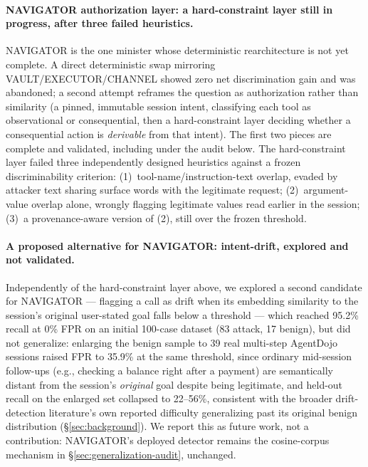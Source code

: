 \paragraph{NAVIGATOR authorization layer: a hard-constraint layer still in
progress, after three failed heuristics.}
\label{par:navigator-authflow}
NAVIGATOR is the one minister whose deterministic rearchitecture is not
yet complete. A direct deterministic swap mirroring VAULT/EXECUTOR/CHANNEL
showed zero net discrimination gain and was abandoned; a second attempt
reframes the question as authorization rather than similarity (a pinned,
immutable session intent, classifying each tool as observational or
consequential, then a hard-constraint layer deciding whether a
consequential action is \emph{derivable} from that intent). The first two
pieces are complete and validated, including under the audit below. The
hard-constraint layer failed three independently designed heuristics
against a frozen discriminability criterion: (1)~tool-name/instruction-text
overlap, evaded by attacker text sharing surface words with the
legitimate request; (2)~argument-value overlap alone, wrongly flagging
legitimate values read earlier in the session; (3)~a provenance-aware
version of (2), still over the frozen threshold.

\paragraph{A proposed alternative for NAVIGATOR: intent-drift, explored and
not validated.} Independently of the hard-constraint layer above, we
explored a second candidate for NAVIGATOR --- flagging a call as drift
when its embedding similarity to the session's original user-stated goal
falls below a threshold --- which reached 95.2\% recall at 0\% FPR on an
initial 100-case dataset (83 attack, 17 benign), but did not generalize:
enlarging the benign sample to 39 real multi-step AgentDojo sessions
raised FPR to 35.9\% at the same threshold, since ordinary mid-session
follow-ups (e.g., checking a balance right after a payment) are
semantically distant
from the session's \emph{original} goal despite being legitimate, and
held-out recall on the enlarged set collapsed to 22--56\%, consistent with
the broader drift-detection literature's own reported difficulty
generalizing past its original benign distribution
(\S\ref{sec:background}). We report this as future work, not a
contribution: NAVIGATOR's deployed detector remains the cosine-corpus
mechanism in \S\ref{sec:generalization-audit}, unchanged.

